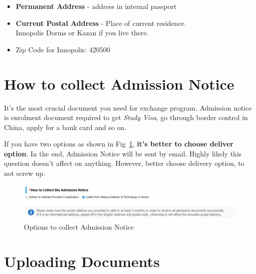 \begin{itemize}
    \item \textbf{Permanent Address} - address in internal passport
    \item \textbf{Current Postal Address} - Place of current residence.\\
        Innopolis Dorms or Kazan if you live there.
    \item Zip Code for Innopolis: 420500
\end{itemize}







\section{How to collect Admission Notice}\label{sec:ru_adm_not_delivery}

It's the most crucial document you need for exchange program.
Admission notice is enrolment document required to get \textit{Study Visa},
go through border control in China, apply for a bank card and so on.

If you have two options as shown in Fig~\ref{fig:ru_collect_adm_not},
\textbf{it's better to choose deliver option}.
In the end, Admission Notice will be sent by email.
Highly likely this question doesn't affect on anything.
However, better choose delivery option, to not screw up.


\begin{figure}[H]
    \centering
    \includegraphics[width=\textwidth]{01_russia/imgs/app_adm_notice}
    \caption{\centering Options to collect Admission Notice}
    \label{fig:ru_collect_adm_not}
\end{figure}






\section{Uploading Documents}\label{sec:ru_upload_docs}

